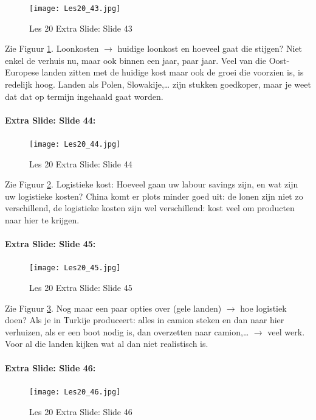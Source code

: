 \documentclass[10pt,a4paper]{report}
\begin{document}
\begin{figure}[h!]
\centering
\texttt{[image: Les20\_43.jpg]}
\caption{Les 20 Extra Slide: Slide 43} 
\label{les20_43}
\end{figure}

Zie Figuur \ref{les20_43}. Loonkosten $\rightarrow$ huidige loonkost en hoeveel gaat die stijgen? Niet enkel de verhuis nu, maar ook binnen een jaar, paar jaar. Veel van die Oost-Europese landen zitten met de huidige kost maar ook de groei die voorzien is, is redelijk hoog. Landen als Polen, Slowakije,… zijn stukken goedkoper, maar je weet dat dat op termijn ingehaald gaat worden. 

\paragraph{Extra Slide: Slide 44:}

\begin{figure}[h!]
\centering
\texttt{[image: Les20\_44.jpg]}
\caption{Les 20 Extra Slide: Slide 44} 
\label{les20_44}
\end{figure}

Zie Figuur \ref{les20_44}. Logistieke kost: Hoeveel gaan uw labour savings zijn, en wat zijn uw logistieke kosten? China komt er plots minder goed uit: de lonen zijn niet zo verschillend, de logistieke kosten zijn wel verschillend: kost veel om producten naar hier te krijgen.

\paragraph{Extra Slide: Slide 45:}

\begin{figure}[h!]
\centering
\texttt{[image: Les20\_45.jpg]}
\caption{Les 20 Extra Slide: Slide 45} 
\label{les20_45}
\end{figure}

Zie Figuur \ref{les20_45}. Nog maar een paar opties over (gele landen) $\rightarrow$ hoe logistiek doen? Als je in Turkije produceert: alles in camion steken en dan naar hier verhuizen, als er een boot nodig is, dan overzetten naar camion,…  $\rightarrow$ veel werk. Voor al die landen kijken wat al dan niet realistisch is.

\paragraph{Extra Slide: Slide 46:}

\begin{figure}[h!]
\centering
\texttt{[image: Les20\_46.jpg]}
\caption{Les 20 Extra Slide: Slide 46} 
\label{les20_46}
\end{figure}
\end{document}
